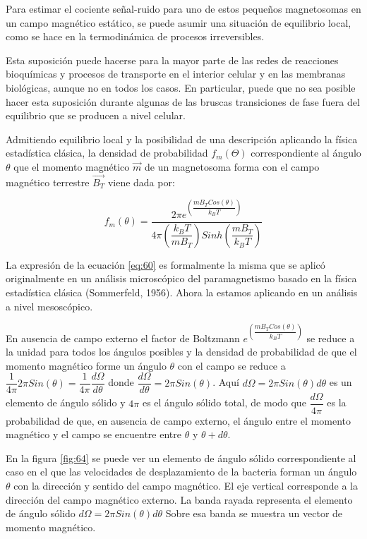 Para estimar el cociente señal-ruido para uno de estos pequeños magnetosomas en un campo magnético estático, se puede asumir una situación de equilibrio local, como se hace en la termodinámica de procesos irreversibles.

Esta suposición puede hacerse para la mayor parte de las redes de reacciones bioquímicas y procesos de transporte en el interior celular y en las membranas biológicas, aunque no en todos los casos. En particular, puede que no sea posible hacer esta suposición durante algunas de las bruscas transiciones de fase fuera del equilibrio que se producen a nivel celular.

Admitiendo equilibrio local y la posibilidad de una descripción aplicando la física estadística clásica, la densidad de probabilidad $f_{m}(\Theta)$ correspondiente al ángulo $\theta$ que el momento magnético $\overrightarrow{m}$ de un magnetosoma forma con el campo magnético terrestre $\overrightarrow{B_{T}}$ viene dada por:

\begin{equation}
	\label{eq:60}
	f_{m}(\theta)=\dfrac { 2\pi e^{\left( \dfrac{m B_{T} Cos(\theta)}{k_{B}T}\right) }}{4\pi \left( \dfrac{k_{B}T}{m B_{T}} \right) Sinh\left( \dfrac{ m B_{T}}{k_{B}T} \right)}    
\end{equation}

La expresión de la ecuación \ref{eq:60} es formalmente la misma que se aplicó originalmente en un análisis microscópico del paramagnetismo basado en la física estadística clásica (Sommerfeld, 1956). Ahora la estamos aplicando en un análisis a nivel mesoscópico.

En ausencia de campo externo el factor de Boltzmann ${e^{\left( \dfrac{m B_{T} Cos(\theta)}{k_{B}T}\right)}}$ se reduce a la unidad para todos los ángulos posibles y la densidad de probabilidad de que el momento magnético forme un ángulo $\theta$ con el campo se reduce a $\dfrac{1}{4\pi} 2 \pi Sin(\theta) = \dfrac{1}{4\pi}\dfrac{d\Omega}{d\theta}$ donde ${\dfrac{d\Omega}{d\theta} = 2\pi Sin(\theta)}$. Aquí $d\Omega=2\pi Sin(\theta) d\theta$ es un elemento de ángulo sólido y $4\pi$ es el ángulo sólido total, de modo que $\dfrac{d\Omega}{4\pi}$ es la probabilidad de que, en ausencia de campo externo, el ángulo entre el momento magnético y el campo se encuentre entre $\theta$ y $\theta + d\theta$.

En la figura \ref{fig:64} se puede ver un elemento de ángulo sólido correspondiente al caso en el que las velocidades de desplazamiento de la bacteria forman un ángulo $\theta$ con la dirección y sentido del campo magnético. El eje vertical corresponde a la dirección del campo magnético externo. La banda rayada representa el elemento de ángulo sólido $d\Omega=2\pi Sin(\theta) d\theta$ Sobre esa banda se muestra un vector de momento magnético.


